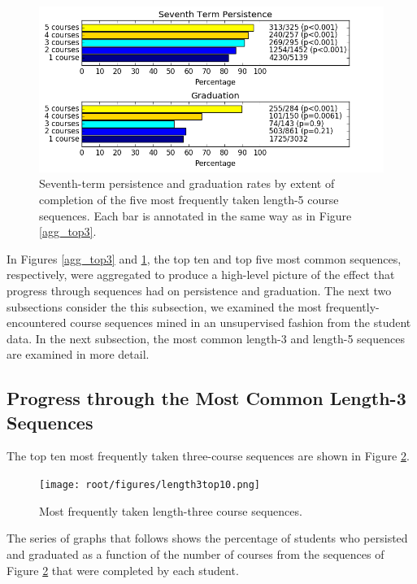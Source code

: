 \begin{figure}[htbp]
\centering
\includegraphics[width=\textwidth]{figures/agg_top5_metrocomp.png}
\caption{Seventh-term persistence and graduation rates by extent of completion of the five most frequently taken length-5 course sequences.  Each bar is annotated in the same way as in Figure \ref{agg_top3}.}
\label{agg_top5}
\end{figure}

In Figures \ref{agg_top3} and \ref{agg_top5}, the top ten and top five most common sequences, respectively, were aggregated to produce a high-level picture of the effect that progress through sequences had on persistence and graduation.  The next two subsections consider the this subsection, we examined the most frequently-encountered course sequences mined in an unsupervised fashion from the student data.  In the next subsection, the most common length-3 and length-5 sequences are examined in more detail.   

\subsection{Progress through the Most Common Length-3 Sequences}

The top ten most frequently taken three-course sequences are shown in Figure \ref{length3top10}.  

\begin{figure}[htbp]
\centering
\texttt{[image: root/figures/length3top10.png]}
\caption{Most frequently taken length-three course sequences.}
\label{length3top10}
\end{figure}

The series of graphs that follows shows the percentage of students who persisted and graduated as a function of the number of courses from the sequences of Figure \ref{length3top10} that were completed by each student.

